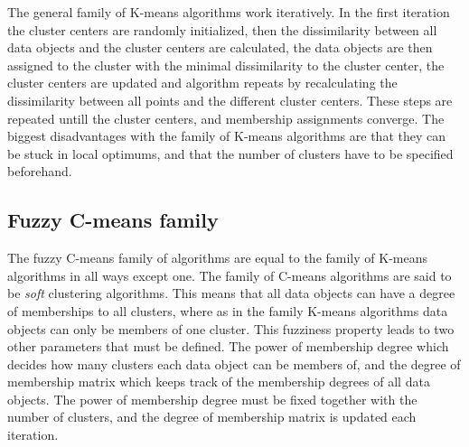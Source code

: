 The general family of K-means algorithms work iteratively. In the first iteration the cluster centers are randomly initialized, 
then the dissimilarity between all data objects and the cluster centers are calculated, 
the data objects are then assigned to the cluster with the minimal dissimilarity to the cluster center,
the cluster centers are updated and algorithm repeats by recalculating the dissimilarity between all points and the different cluster centers.
These steps are repeated untill the cluster centers, and membership assignments converge.
The biggest disadvantages with the family of K-means algorithms are that they can be stuck in local optimums, 
and that the number of clusters have to be specified beforehand.

\subsection{Fuzzy C-means family}
The fuzzy C-means family of algorithms are equal to the family of K-means algorithms in all ways except one. 
The family of C-means algorithms are said to be \textit{soft} clustering algorithms. 
This means that all data objects can have a degree of memberships to all clusters, where as in the family K-means algorithms data objects can only be members of one cluster.
This fuzziness property leads to two other parameters that must be defined.
The power of membership degree which decides how many clusters each data object can be members of, 
and the degree of membership matrix which keeps track of the membership degrees of all data objects.
The power of membership degree must be fixed together with the number of clusters, and the degree of membership matrix is updated each iteration.

